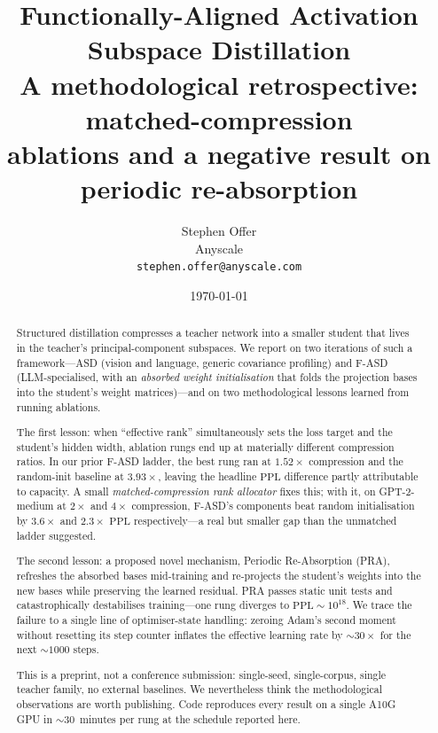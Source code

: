 \documentclass[11pt]{article}
\title{Functionally-Aligned Activation Subspace Distillation\\[2pt]
       \large A methodological retrospective: matched-compression\\
       ablations and a negative result on periodic re-absorption}
\author{%
  Stephen Offer \\
  Anyscale \\
  \texttt{stephen.offer@anyscale.com}
}
\date{\today}
\newcommand{\PPL}{\ensuremath{\mathrm{PPL}}}
\newcommand{\fasd}{\textsc{F-ASD}}
\newcommand{\asd}{\textsc{ASD}}
\newcommand{\pra}{\textsc{PRA}}
\begin{document}
\maketitle

\begin{abstract}
Structured distillation compresses a teacher network into a smaller student
that lives in the teacher's principal-component subspaces. We report on two
iterations of such a framework---\asd{} (vision and language, generic
covariance profiling) and \fasd{} (LLM-specialised, with an
\emph{absorbed weight initialisation} that folds the projection bases into
the student's weight matrices)---and on two methodological lessons learned
from running ablations.

The first lesson: when ``effective rank'' simultaneously sets the loss
target and the student's hidden width, ablation rungs end up at materially
different compression ratios. In our prior \fasd{} ladder, the best rung
ran at $1.52\times$ compression and the random-init baseline at
$3.93\times$, leaving the headline \PPL{} difference partly attributable
to capacity. A small \emph{matched-compression rank allocator} fixes
this; with it, on GPT-2-medium at $2\times$ and $4\times$ compression,
\fasd{}'s components beat random initialisation by $3.6\times$ and
$2.3\times$ \PPL{} respectively---a real but smaller gap than the
unmatched ladder suggested.

The second lesson: a proposed novel mechanism, Periodic Re-Absorption
(\pra{}), refreshes the absorbed bases mid-training and re-projects the
student's weights into the new bases while preserving the learned
residual. \pra{} passes static unit tests and catastrophically destabilises
training---one rung diverges to $\PPL\!\sim\!10^{18}$. We trace the
failure to a single line of optimiser-state handling: zeroing Adam's
second moment without resetting its step counter inflates the effective
learning rate by $\sim$$30\times$ for the next $\sim\!1000$ steps.

This is a preprint, not a conference submission: single-seed,
single-corpus, single teacher family, no external baselines. We
nevertheless think the methodological observations are worth publishing.
Code reproduces every result on a single A10G GPU in $\sim$$30$~minutes
per rung at the schedule reported here.
\end{abstract}
\end{document}

